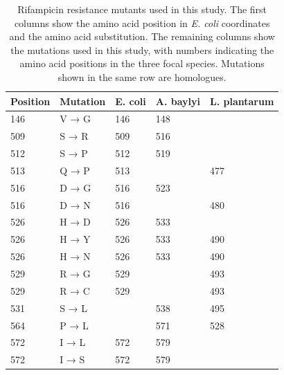 \begin{table}[H]
\centering
\begingroup\small\renewcommand{\arraystretch}{0.8}
\begin{tabular}{lllll}
  \hline
Position & Mutation & E. coli & A. baylyi & L. plantarum \\ 
  \hline
146 & V → G & 146 & 148 &  \\ 
  509 & S → R & 509 & 516 &  \\ 
  512 & S → P & 512 & 519 &  \\ 
  513 & Q → P & 513 &  & 477 \\ 
  516 & D → G & 516 & 523 &  \\ 
  516 & D → N & 516 &  & 480 \\ 
  526 & H → D & 526 & 533 &  \\ 
  526 & H → Y & 526 & 533 & 490 \\ 
  526 & H → N & 526 & 533 & 490 \\ 
  529 & R → G & 529 &  & 493 \\ 
  529 & R → C & 529 &  & 493 \\ 
  531 & S → L &  & 538 & 495 \\ 
  564 & P → L &  & 571 & 528 \\ 
  572 & I → L & 572 & 579 &  \\ 
  572 & I → S & 572 & 579 &  \\ 
   \hline
\end{tabular}
\endgroup
\caption{Rifampicin resistance mutants used in this study.
         The first columns show the amino acid position in \textit{E. coli} coordinates and the amino acid substitution. 
         The remaining columns show the mutations used in this study, with numbers indicating the amino acid positions in the three focal species. 
         Mutations shown in the same row are homologues.} 
\label{tab:mutations}
\end{table}

